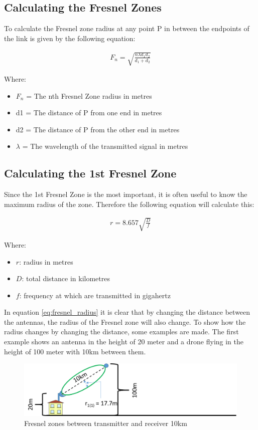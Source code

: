 \subsection{Calculating the Fresnel Zones}
To calculate the Fresnel zone radius at any point P in between the endpoints of the link is given by the following equation: 

\begin{align*}
F_n = \sqrt{\frac{n \lambda d_1 d_2}{d_1+d_2}}
\end{align*}

Where:
\begin{itemize}[label=]
\item $F_n$ = The nth Fresnel Zone radius in metres
\item d1 = The distance of P from one end in metres
\item d2 = The distance of P from the other end in metres
\item $\lambda$ = The wavelength of the transmitted signal in metres
\end{itemize}

\subsection{Calculating the 1st Fresnel Zone}
Since the 1st Fresnel Zone is the most important, it is often useful to know the maximum radius of the zone. Therefore the following equation will calculate this:

\begin{align}
r= 8.657 \sqrt{\frac{D}{f}} \label{eq:fresnel_radius}
\end{align}

Where:
\begin{itemize}[label=]
    \item $r$: radius in metres
    \item $D$: total distance in kilometres
    \item $f$: frequency at which are transmitted in gigahertz
\end{itemize}

In equation \ref{eq:fresnel_radius} it is clear that by changing the distance between the antennas, the radius of the Fresnel zone will also change. To show how the radius changes by changing the distance, some examples are made. The first example shows an antenna in the height of 20 meter and a drone flying in the height of 100 meter with 10km between them.

\begin{figure}[H]
	\centering
	\includegraphics[scale=0.50]{figures/fresnel_10km.png}
	\caption{Fresnel zones between transmitter and receiver 10km}
	\label{fig:fresnel_zones_10km}
\end{figure}  

